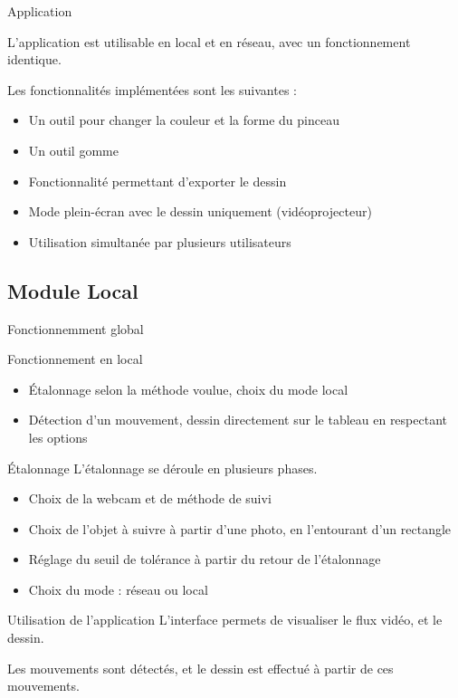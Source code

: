 \documentclass{beamer}
\begin{document}
	\begin{frame}{Application}
			
			L'application est utilisable en local et en réseau, avec un fonctionnement identique.
			
			Les fonctionnalités implémentées sont les suivantes :
			\begin{itemize}
			\item Un outil pour changer la couleur et la forme du pinceau
			\item Un outil gomme
			\item Fonctionnalité permettant d'exporter le dessin
			\item Mode plein-écran avec le dessin uniquement (vidéoprojecteur)
			\item Utilisation simultanée par plusieurs utilisateurs
			\end{itemize}
		\end{frame}
		
	\subsection{Module Local}
		\begin{frame}{Fonctionnemment global}
			\begin{block}{Fonctionnement en local}
				\begin{itemize}
				\item Étalonnage selon la méthode voulue, choix du mode local
				\item Détection d'un mouvement, dessin directement sur le tableau en respectant les options
				\end{itemize}
			\end{block}
		\end{frame}
		
		\begin{frame}{Étalonnage}
			L'étalonnage se déroule en plusieurs phases.
			\begin{itemize}
			\item Choix de la webcam et de méthode de suivi
			\item Choix de l'objet à suivre à partir d'une photo, en l'entourant d'un rectangle
			\item Réglage du seuil de tolérance à partir du retour de l'étalonnage
			\item Choix du mode : réseau ou local
			\end{itemize}
		\end{frame}
		
		\begin{frame}{Utilisation de l'application}
		L'interface permets de visualiser le flux vidéo, et le dessin.
		
		Les mouvements sont détectés, et le dessin est effectué à partir de ces mouvements.
		\end{frame}
		
\end{document}
